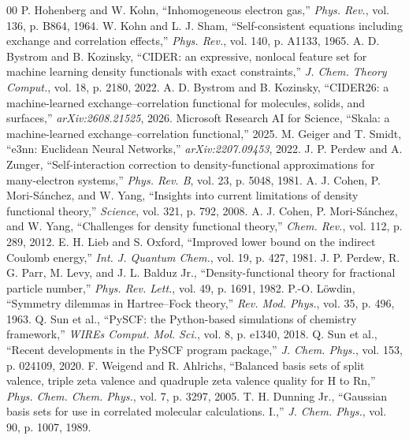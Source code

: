 \documentclass[conference]{IEEEtran}
\begin{document}
\begin{thebibliography}{00}
 P. Hohenberg and W. Kohn, ``Inhomogeneous electron gas,'' \textit{Phys. Rev.}, vol. 136, p. B864, 1964.
 W. Kohn and L. J. Sham, ``Self-consistent equations including exchange and correlation effects,'' \textit{Phys. Rev.}, vol. 140, p. A1133, 1965.
 A. D. Bystrom and B. Kozinsky, ``CIDER: an expressive, nonlocal feature set for machine learning density functionals with exact constraints,'' \textit{J. Chem. Theory Comput.}, vol. 18, p. 2180, 2022.
 A. D. Bystrom and B. Kozinsky, ``CIDER26: a machine-learned exchange--correlation functional for molecules, solids, and surfaces,'' \textit{arXiv:2608.21525}, 2026.
 Microsoft Research AI for Science, ``Skala: a machine-learned exchange--correlation functional,'' 2025.
 M. Geiger and T. Smidt, ``e3nn: Euclidean Neural Networks,'' \textit{arXiv:2207.09453}, 2022.
 J. P. Perdew and A. Zunger, ``Self-interaction correction to density-functional approximations for many-electron systems,'' \textit{Phys. Rev. B}, vol. 23, p. 5048, 1981.
 A. J. Cohen, P. Mori-S\'anchez, and W. Yang, ``Insights into current limitations of density functional theory,'' \textit{Science}, vol. 321, p. 792, 2008.
 A. J. Cohen, P. Mori-S\'anchez, and W. Yang, ``Challenges for density functional theory,'' \textit{Chem. Rev.}, vol. 112, p. 289, 2012.
 E. H. Lieb and S. Oxford, ``Improved lower bound on the indirect Coulomb energy,'' \textit{Int. J. Quantum Chem.}, vol. 19, p. 427, 1981.
 J. P. Perdew, R. G. Parr, M. Levy, and J. L. Balduz Jr., ``Density-functional theory for fractional particle number,'' \textit{Phys. Rev. Lett.}, vol. 49, p. 1691, 1982.
 P.-O. L\"owdin, ``Symmetry dilemmas in Hartree--Fock theory,'' \textit{Rev. Mod. Phys.}, vol. 35, p. 496, 1963.
 Q. Sun et al., ``PySCF: the Python-based simulations of chemistry framework,'' \textit{WIREs Comput. Mol. Sci.}, vol. 8, p. e1340, 2018.
 Q. Sun et al., ``Recent developments in the PySCF program package,'' \textit{J. Chem. Phys.}, vol. 153, p. 024109, 2020.
 F. Weigend and R. Ahlrichs, ``Balanced basis sets of split valence, triple zeta valence and quadruple zeta valence quality for H to Rn,'' \textit{Phys. Chem. Chem. Phys.}, vol. 7, p. 3297, 2005.
 T. H. Dunning Jr., ``Gaussian basis sets for use in correlated molecular calculations. I.,'' \textit{J. Chem. Phys.}, vol. 90, p. 1007, 1989.
\end{thebibliography}
\end{document}
